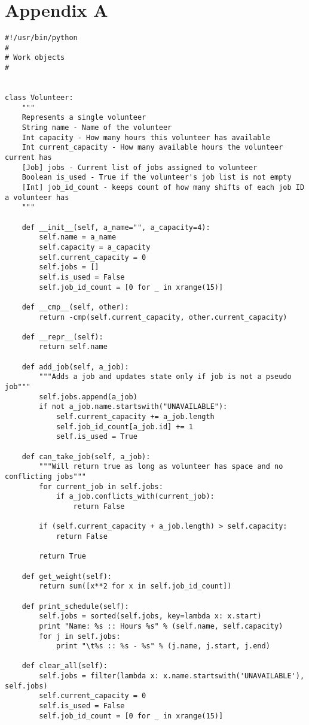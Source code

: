 \documentclass[11pt]{article}
\theoremstyle{definition}
\begin{document}
\section{Appendix A}
\begin{lstlisting}
#!/usr/bin/python
#
# Work objects
#


class Volunteer:
    """
    Represents a single volunteer
    String name - Name of the volunteer
    Int capacity - How many hours this volunteer has available
    Int current_capacity - How many available hours the volunteer current has
    [Job] jobs - Current list of jobs assigned to volunteer
    Boolean is_used - True if the volunteer's job list is not empty
    [Int] job_id_count - keeps count of how many shifts of each job ID a volunteer has
    """

    def __init__(self, a_name="", a_capacity=4):
        self.name = a_name
        self.capacity = a_capacity
        self.current_capacity = 0
        self.jobs = []
        self.is_used = False
        self.job_id_count = [0 for _ in xrange(15)]

    def __cmp__(self, other):
        return -cmp(self.current_capacity, other.current_capacity)

    def __repr__(self):
        return self.name

    def add_job(self, a_job):
        """Adds a job and updates state only if job is not a pseudo job"""
        self.jobs.append(a_job)
        if not a_job.name.startswith("UNAVAILABLE"):
            self.current_capacity += a_job.length
            self.job_id_count[a_job.id] += 1
            self.is_used = True

    def can_take_job(self, a_job):
        """Will return true as long as volunteer has space and no conflicting jobs"""
        for current_job in self.jobs:
            if a_job.conflicts_with(current_job):
                return False

        if (self.current_capacity + a_job.length) > self.capacity:
            return False

        return True

    def get_weight(self):
        return sum([x**2 for x in self.job_id_count])

    def print_schedule(self):
        self.jobs = sorted(self.jobs, key=lambda x: x.start)
        print "Name: %s :: Hours %s" % (self.name, self.capacity)
        for j in self.jobs:
            print "\t%s :: %s - %s" % (j.name, j.start, j.end)

    def clear_all(self):
        self.jobs = filter(lambda x: x.name.startswith('UNAVAILABLE'), self.jobs)
        self.current_capacity = 0
        self.is_used = False
        self.job_id_count = [0 for _ in xrange(15)]



\end{lstlisting}
\end{document}

